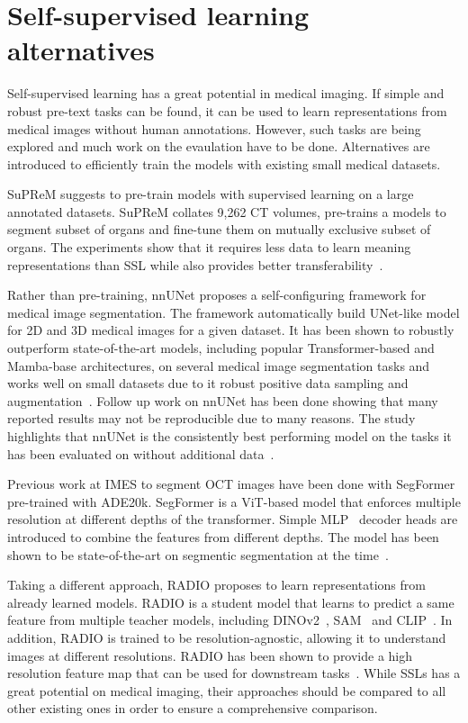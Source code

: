 \documentclass[a4paper,11pt,oneside]{report}
\begin{document}
\section{Self-supervised learning alternatives}
Self-supervised learning has a great potential in medical imaging. If simple and robust pre-text tasks can be found, it can be used to learn representations from medical images without human annotations. However, such tasks are being explored and much work on the evaulation have to be done. Alternatives are introduced to efficiently train the models with existing small medical datasets.

SuPReM suggests to pre-train models with supervised learning on a large annotated datasets. SuPReM collates 9,262 CT volumes, pre-trains a models to segment subset of organs and fine-tune them on mutually exclusive subset of organs. The experiments show that it requires less data to learn meaning representations than SSL while also provides better transferability~\cite{Li2024}.

Rather than pre-training, nnUNet proposes a self-configuring framework for medical image segmentation. The framework automatically build UNet-like model for 2D and 3D medical images for a given dataset. It has been shown to robustly outperform state-of-the-art models, including popular Transformer-based and Mamba-base architectures, on several medical image segmentation tasks and works well on small datasets due to it robust positive data sampling and augmentation~\cite{Isensee2020}. Follow up work on nnUNet has been done showing that many reported results may not be reproducible due to many reasons. The study highlights that nnUNet is the consistently best performing model on the tasks it has been evaluated on without additional data~\cite{Isensee2024}.

Previous work at IMES to segment OCT images have been done with SegFormer pre-trained with ADE20k. SegFormer is a ViT-based model that enforces multiple resolution at different depths of the transformer. Simple MLP~\cite{Rumelhart1986} decoder heads are introduced to combine the features from different depths. The model has been shown to be state-of-the-art on segmentic segmentation at the time~\cite{Xie2021SegFormer}.

Taking a different approach, RADIO proposes to learn representations from already learned models. RADIO is a student model that learns to predict a same feature from multiple teacher models, including DINOv2~\cite{Oquab2024dinov}, SAM~\cite{Kirillov2023SAM} and CLIP~\cite{Radford2021CLIP}. In addition, RADIO is trained to be resolution-agnostic, allowing it to understand images at different resolutions. RADIO has been shown to provide a high resolution feature map that can be used for downstream tasks~\cite{Ranzinger2024RADIO}. While SSLs has a great potential on medical imaging, their approaches should be compared to all other existing ones in order to ensure a comprehensive comparison.
\end{document}
